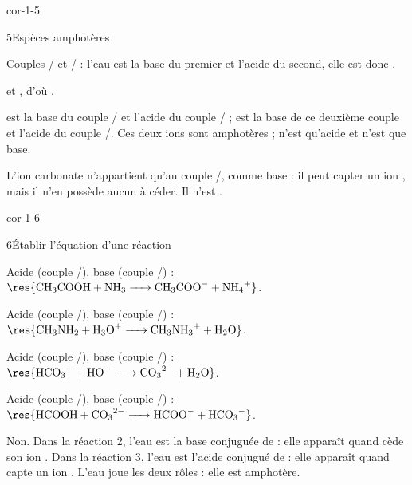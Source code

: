 \begin{blocLivre}{cor-1-5}
\begin{corrige}{5}{Espèces amphotères}
\begin{questions}
\item Couples / et / : l'eau est la base du premier et l'acide du
second, elle est donc .
\item {} et , d'où .
\item {} est la base du couple / et l'acide du couple
/ ;  est la base de ce deuxième couple et l'acide du couple
/. Ces deux ions sont amphotères ;  n'est qu'acide et 
n'est que base.
\item L'ion carbonate n'appartient qu'au couple /, comme base : il peut capter
un ion , mais il n'en possède aucun à céder. Il n'est .
\end{questions}
\end{corrige}
\end{blocLivre}
\begin{blocLivre}{cor-1-6}
\begin{corrige}{6}{Établir l'équation d'une réaction}
\begin{questions}
\item Acide  (couple /), base  (couple /) :\\
\enspace$\res{\ce{CH3COOH + NH3 -> CH3COO- + NH4+}}$.
\item Acide  (couple /), base  (couple /) :\\
$\res{\ce{CH3NH2 + H3O+ -> CH3NH3+ + H2O}}$.
\item Acide  (couple /), base  (couple /) :\\
$\res{\ce{HCO3- + HO- -> CO3^2- + H2O}}$.
\item Acide  (couple /), base  (couple /) :\\
$\res{\ce{HCOOH + CO3^2- -> HCOO- + HCO3-}}$.
\item Non. Dans la réaction 2, l'eau est la base conjuguée de  : elle apparaît quand 
cède son ion . Dans la réaction 3, l'eau est l'acide conjugué de  : elle apparaît quand
 capte un ion . L'eau joue les deux rôles : elle est amphotère.
\end{questions}
\end{corrige}
\end{blocLivre}
